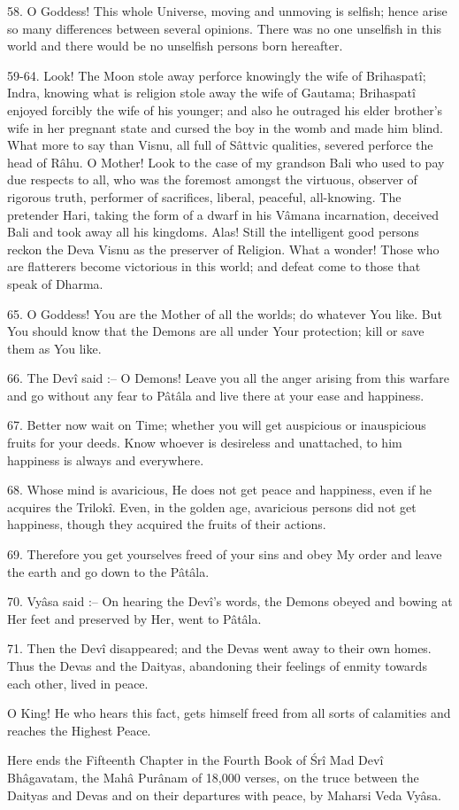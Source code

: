 58. O Goddess! This whole Universe, moving and unmoving is selfish; hence arise so many differences between several opinions. There was no one unselfish in this world and there would be no unselfish persons born hereafter.

59-64. Look! The Moon stole away perforce knowingly the wife of Brihaspat\^i; Indra, knowing what is religion stole away the wife of Gautama; Brihaspat\^i enjoyed forcibly the wife of his younger; and also he outraged his elder brother's wife in her pregnant state and cursed the boy in the womb and made him blind. What more to say than Visnu, all full of S\^attvic qualities, severed perforce the head of R\^ahu. O Mother! Look to the case of my grandson Bali who used to pay due respects to all, who was the foremost amongst the virtuous, observer of rigorous truth, performer of sacrifices, liberal, peaceful, all-knowing. The pretender Hari, taking the form of a dwarf in his V\^amana incarnation, deceived Bali and took away all his kingdoms. Alas! Still the intelligent good persons reckon the Deva Visnu as the preserver of Religion. What a wonder! Those who are flatterers become victorious in this world; and defeat come to those that speak of Dharma.

65. O Goddess! You are the Mother of all the worlds; do whatever You like. But You should know that the Demons are all under Your protection; kill or save them as You like.

66. The Dev\^i said :-- O Demons! Leave you all the anger arising from this warfare and go without any fear to P\^at\^ala and live there at your ease and happiness.

67. Better now wait on Time; whether you will get auspicious or inauspicious fruits for your deeds. Know whoever is desireless and unattached, to him happiness is always and everywhere.

68. Whose mind is avaricious, He does not get peace and happiness, even if he acquires the Trilok\^i. Even, in the golden age, avaricious persons did not get happiness, though they acquired the fruits of their actions.

69. Therefore you get yourselves freed of your sins and obey My order and leave the earth and go down to the P\^at\^ala.

70. Vy\^asa said :-- On hearing the Dev\^i's words, the Demons obeyed and bowing at Her feet and preserved by Her, went to P\^at\^ala.

71. Then the Dev\^i disappeared; and the Devas went away to their own homes. Thus the Devas and the Daityas, abandoning their feelings of enmity towards each other, lived in peace.

O King! He who hears this fact, gets himself freed from all sorts of calamities and reaches the Highest Peace.

Here ends the Fifteenth Chapter in the Fourth Book of \'Sr\^i Mad Dev\^i Bh\^agavatam, the Mah\^a Pur\^anam of 18,000 verses, on the truce between the Daityas and Devas and on their departures with peace, by Maharsi Veda Vy\^asa.